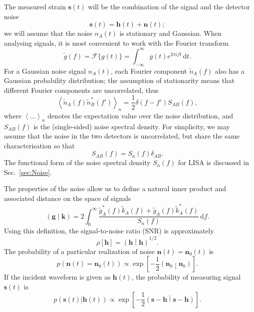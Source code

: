 \documentclass[useAMS,usedcolumn,usegraphicx,usenatbib]{mn2e}
\newcommand{\secref}[1]{Sec.~\ref{sec:#1}}
\newcommand{\dd}{\ensuremath{\mathrm{d}}}
\newcommand{\intd}[4]{\ensuremath{\int_{#1}^{#2}{#3}\,\dd{#4}}}
\newcommand{\recip}[1]{\ensuremath{\frac{1}{#1}}}
\newcommand{\innerprod}[2]{\ensuremath{\left({#1}\middle|{#2}\right)}}
\begin{document}
The measured strain $\boldsymbol{s}(t)$ will be the combination of the signal and the detector noise
\begin{equation}
\boldsymbol{s}(t) = \boldsymbol{h}(t) + \boldsymbol{n}(t);
\end{equation}
we will assume that the noise $n_A(t)$ is stationary and Gaussian. When analysing signals, it is most convenient to work with the Fourier transform
\begin{equation}
\tilde{g}(f) = \mathscr{F}\{g(t)\} = \intd{-\infty}{\infty}{g(t)e^{2\pi i ft}}{t}.
\end{equation}
For a Gaussian noise signal $n_A(t)$, each Fourier component $\tilde{n}_A(f)$ also has a Gaussian probability distribution; the assumption of stationarity means that different Fourier components are uncorrelated, thus \citep{Cutler1994}
\begin{equation}
\left\langle\tilde{n}_A(f)\tilde{n}_B^*(f')\right\rangle_n = \recip{2}\delta(f - f')S_{AB}(f),
\end{equation}
where $\left\langle\ldots\right\rangle_n$ denotes the expectation value over the noise distribution, and $S_{AB}(f)$ is the (single-sided) noise spectral density. For simplicity, we may assume that the noise in the two detectors is uncorrelated, but share the same characterisation so that \citep{Cutler1998}
\begin{equation}
S_{AB}(f) = S_n(f)\delta_{AB}.
\end{equation}
The functional form of the noise spectral density $S_n(f)$ for LISA is discussed in \secref{Noise}.

The properties of the noise allow us to define a natural inner product and associated distance on the space of signals \citep{Cutler1994}
\begin{equation}
\innerprod{\boldsymbol{g}}{\boldsymbol{k}} = 2\intd{0}{\infty}{\frac{\tilde{g}_A^*(f)\tilde{k}_A(f) + \tilde{g}_A(f)\tilde{k}_A^*(f)}{S_n(f)}}{f}.
\label{eq:inner}
\end{equation}
Using this definition, the signal-to-noise ratio (SNR) is approximately
\begin{equation}
\rho[\boldsymbol{h}] = \innerprod{\boldsymbol{h}}{\boldsymbol{h}}^{1/2}.
\label{eq:SNR}
\end{equation}
The probability of a particular realization of noise $\boldsymbol{n}(t) = \boldsymbol{n}_0(t)$ is
\begin{equation}
p(\boldsymbol{n}(t) = \boldsymbol{n}_0(t)) \propto \exp\left[-\recip{2}\innerprod{\boldsymbol{n}_0}{\boldsymbol{n}_0}\right].
\end{equation}
If the incident waveform is given as $\boldsymbol{h}(t)$, the probability of measuring signal $\boldsymbol{s}(t)$ is
\begin{equation}
p(\boldsymbol{s}(t)|\boldsymbol{h}(t)) \propto \exp\left[-\recip{2}\innerprod{\boldsymbol{s}-\boldsymbol{h}}{\boldsymbol{s}-\boldsymbol{h}}\right].
\label{eq:sig_prob}
\end{equation}
\end{document}
